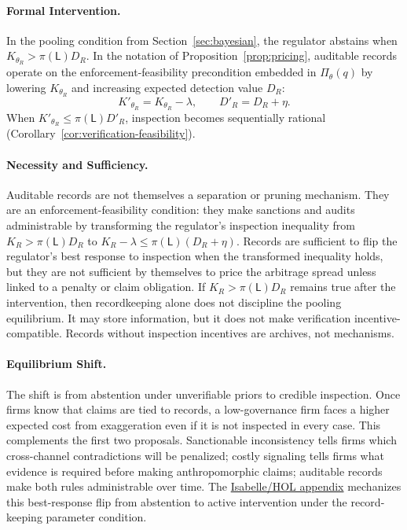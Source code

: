 \documentclass[preprint,authoryear]{elsarticle}
\theoremstyle{definition}
\theoremstyle{plain}
\begin{document}
\paragraph{Formal Intervention.}
In the pooling condition from Section~\ref{sec:bayesian}, the
regulator abstains when $K_{\theta_R}>\pi(\mathsf{L})D_R$.  In the notation of
Proposition~\ref{prop:pricing}, auditable records operate on the
enforcement-feasibility precondition embedded in $\Pi_\theta(q)$ by
lowering $K_{\theta_R}$ and increasing expected detection value $D_R$:
\[
K'_{\theta_R}=K_{\theta_R}-\lambda,\qquad
D'_R=D_R+\eta .
\]
When $K'_{\theta_R}\leq \pi(\mathsf{L})D'_R$, inspection becomes sequentially
rational (Corollary~\ref{cor:verification-feasibility}).

\paragraph{Necessity and Sufficiency.}
Auditable records are not themselves a separation or pruning mechanism.
They are an enforcement-feasibility condition: they make sanctions and audits
administrable by transforming the regulator's inspection inequality from
$K_R>\pi(\mathsf{L})D_R$ to $K_R-\lambda \le \pi(\mathsf{L})(D_R+\eta)$.
Records are sufficient to flip the regulator's best response to inspection when
the transformed inequality holds, but they are not sufficient by themselves to
price the arbitrage spread unless linked to a penalty or claim obligation.
If $K_R>\pi(\mathsf{L})D_R$ remains true after the intervention, then
recordkeeping alone does not discipline the pooling equilibrium.  It may store
information, but it does not make verification incentive-compatible.  Records
without inspection incentives are archives, not mechanisms.

\paragraph{Equilibrium Shift.}
The shift is from abstention under unverifiable priors to credible inspection.
Once firms know that claims are tied to records, a low-governance firm faces a
higher expected cost from exaggeration even if it is not inspected in every
case. This complements the first two proposals. Sanctionable inconsistency tells
firms which cross-channel contradictions will be penalized; costly signaling
tells firms what evidence is required before making anthropomorphic claims;
auditable records make both rules administrable over time. The \hyperref[app:isabelle]{Isabelle/HOL appendix} mechanizes this best-response flip from abstention to active intervention under the record-keeping parameter condition.
\end{document}
